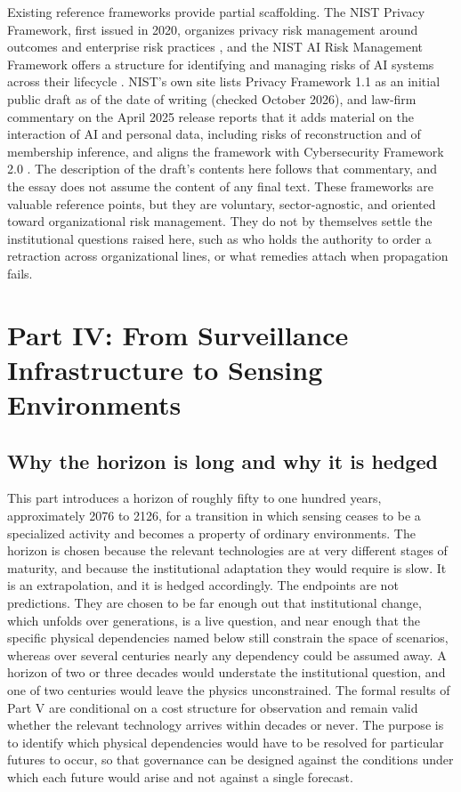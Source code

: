 \documentclass[11pt]{article}
\theoremstyle{plain}
\theoremstyle{definition}
\theoremstyle{remark}
\begin{document}
Existing reference frameworks provide partial scaffolding. The NIST Privacy Framework, first issued in 2020, organizes privacy risk management around outcomes and enterprise risk practices \cite{nistpf}, and the NIST AI Risk Management Framework offers a structure for identifying and managing risks of AI systems across their lifecycle \cite{nistairmf}. NIST's own site lists Privacy Framework 1.1 as an initial public draft as of the date of writing (checked October 2026), and law-firm commentary on the April 2025 release reports that it adds material on the interaction of AI and personal data, including risks of reconstruction and of membership inference, and aligns the framework with Cybersecurity Framework 2.0 \cite{nistpf11}. The description of the draft's contents here follows that commentary, and the essay does not assume the content of any final text. These frameworks are valuable reference points, but they are voluntary, sector-agnostic, and oriented toward organizational risk management. They do not by themselves settle the institutional questions raised here, such as who holds the authority to order a retraction across organizational lines, or what remedies attach when propagation fails.

\section{Part IV: From Surveillance Infrastructure to Sensing Environments}

\subsection{Why the horizon is long and why it is hedged}

This part introduces a horizon of roughly fifty to one hundred years, approximately 2076 to 2126, for a transition in which sensing ceases to be a specialized activity and becomes a property of ordinary environments. The horizon is chosen because the relevant technologies are at very different stages of maturity, and because the institutional adaptation they would require is slow. It is an extrapolation, and it is hedged accordingly. The endpoints are not predictions. They are chosen to be far enough out that institutional change, which unfolds over generations, is a live question, and near enough that the specific physical dependencies named below still constrain the space of scenarios, whereas over several centuries nearly any dependency could be assumed away. A horizon of two or three decades would understate the institutional question, and one of two centuries would leave the physics unconstrained. The formal results of Part V are conditional on a cost structure for observation and remain valid whether the relevant technology arrives within decades or never. The purpose is to identify which physical dependencies would have to be resolved for particular futures to occur, so that governance can be designed against the conditions under which each future would arise and not against a single forecast.
\end{document}
